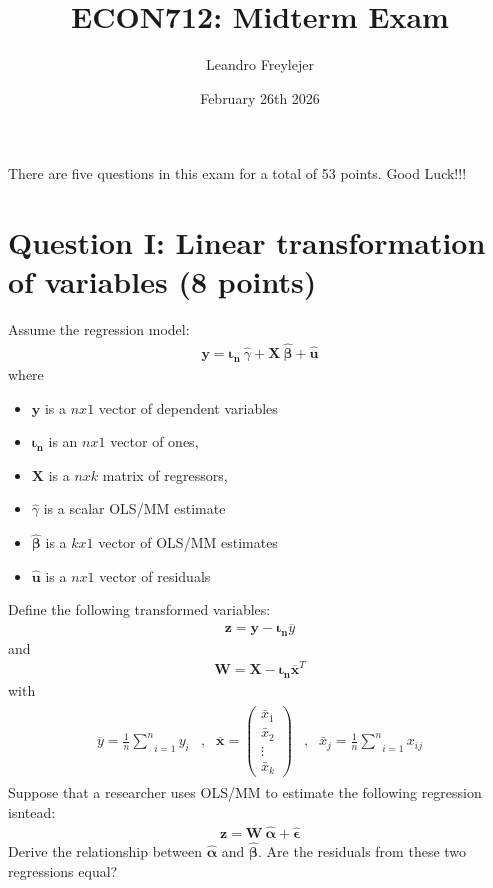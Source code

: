 \documentclass[letterpaper,12pt]{article}
\title{\vspace{-1.2in} ECON712: Midterm Exam}
\author{Leandro Freylejer}
\date{February 26th 2026}
\theoremstyle{dotlessS}
\begin{document}
\maketitle
\vspace{-.2in}
\noindent There are five questions in this exam for a total of 53 points. Good Luck!!!

\section*{Question I: Linear transformation of variables (8 points)}
Assume the regression model:
\begin{eqnarray*}
\bm{y}=\bm{\iota_n} \: \hat{\gamma} + \bm{X} \: \bm{\hat{\beta}}+\bm{\hat{u}}
\end{eqnarray*}
where
\begin{itemize}
\item $\bm{y}$ is a $nx1$ vector of dependent variables
\item $\bm{\iota_n}$ is an $nx1$ vector of ones, 
\item $\bm{X}$ is a $nxk$ matrix of regressors, 
\item $\hat{\gamma}$ is a scalar OLS/MM estimate
\item $\bm{\hat{\beta}}$ is a $kx1$ vector of OLS/MM estimates
\item $\bm{\hat{u}}$ is a $nx1$ vector of residuals
\end{itemize}
Define the following transformed variables:
\begin{eqnarray*}
\bm{z}=\bm{y}- \bm{\iota_n} \overline{y}
\end{eqnarray*}
and
\begin{eqnarray*}
\bm{W}=\bm{X}-\bm{\iota_n} \bm{\overline{x}}^T
\end{eqnarray*}
with
\begin{eqnarray*}
\begin{array}{lllll}
\overline{y}=\frac{1}{n}\underset{i=1}{\overset{n}{\sum}}y_{i} &,& \bm{\overline{x}}=\begin{pmatrix} \bar{x}_1 \\ \bar{x}_2 \\ \vdots  \\  \bar{x}_k \end{pmatrix} &,& \bar{x}_j=\frac{1}{n}\underset{i=1}{\overset{n}{\sum}}x_{ij} 
\end{array}
\end{eqnarray*}
Suppose that a researcher uses OLS/MM to estimate the following regression isntead:
\begin{eqnarray*}
\bm{z}= \bm{W} \: \bm{\hat{\alpha}}+\bm{\hat{\epsilon}}
\end{eqnarray*}
Derive the relationship between $\bm{\hat{\alpha}}$ and $\bm{\hat{\beta}}$. Are the residuals from these two regressions equal? 
\end{document}
